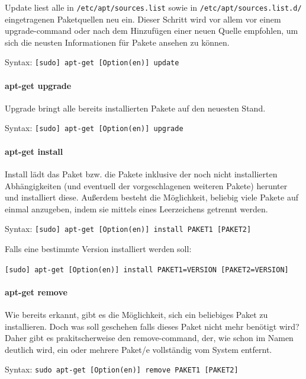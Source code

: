 Update liest alle in \texttt{/etc/apt/sources.list} sowie in
\texttt{/etc/apt/sources.list.d/} eingetragenen Paketquellen neu ein.
Dieser Schritt wird vor allem vor einem upgrade-command oder nach dem
Hinzufügen einer neuen Quelle empfohlen, um sich die neusten
Informationen für Pakete ansehen zu können.

Syntax: \texttt{{[}sudo{]}\ apt-get\ {[}Option(en){]}\ update}

\hypertarget{apt-get-upgrade}{%
\paragraph{apt-get upgrade}\label{apt-get-upgrade}}

Upgrade bringt alle bereits installierten Pakete auf den neuesten Stand.

Syntax: \texttt{{[}sudo{]}\ apt-get\ {[}Option(en){]}\ upgrade}

\hypertarget{apt-get-install}{%
\paragraph{apt-get install}\label{apt-get-install}}

Install lädt das Paket bzw. die Pakete inklusive der noch nicht
installierten Abhängigkeiten (und eventuell der vorgeschlagenen weiteren
Pakete) herunter und installiert diese. Außerdem besteht die
Möglichkeit, beliebig viele Pakete auf einmal anzugeben, indem sie
mittels eines Leerzeichens getrennt werden.

Syntax:
\texttt{{[}sudo{]}\ apt-get\ {[}Option(en){]}\ install\ PAKET1\ {[}PAKET2{]}}

Falls eine bestimmte Version installiert werden soll:

\texttt{{[}sudo{]}\ apt-get\ {[}Option(en){]}\ install\ PAKET1=VERSION\ {[}PAKET2=VERSION{]}}

\hypertarget{apt-get-remove}{%
\paragraph{apt-get remove}\label{apt-get-remove}}

Wie bereits erkannt, gibt es die Möglichkeit, sich ein beliebiges Paket
zu installieren. Doch was soll geschehen falls dieses Paket nicht mehr
benötigt wird? Daher gibt es prakitscherweise den remove-command, der,
wie schon im Namen deutlich wird, ein oder mehrere Paket/e vollständig
vom System entfernt.

Syntax:
\texttt{sudo\ apt-get\ {[}Option(en){]}\ remove\ PAKET1\ {[}PAKET2{]}}

